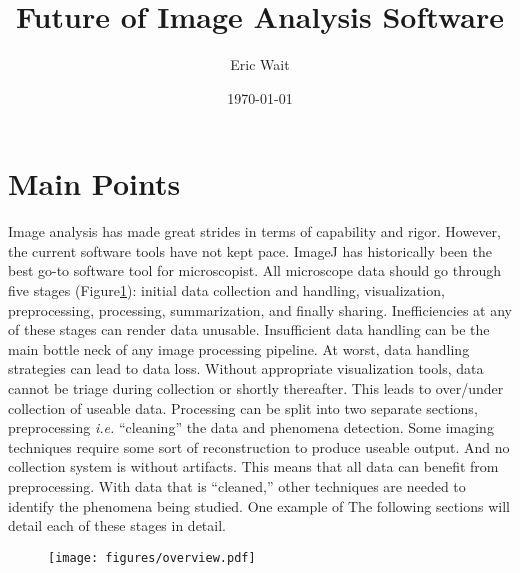 \documentclass[11pt]{article}
\author{Eric Wait}
\title{Future of Image Analysis Software}
\date{\today}
\newcommand{\ie}[1]{\textit{i.e.} {#1}}
\begin{document}
	\maketitle
	\newpage

	\tableofcontents

	\listoftodos
	\newpage

	\section{Main Points}\label{sec:main_points}
		Image analysis has made great strides in terms of capability and rigor.
		However, the current software tools have not kept pace.
		ImageJ has historically been the best go-to software tool for microscopist.
		All microscope data should go through five stages (Figure\ref{fig:overview}): initial data collection and handling, visualization, preprocessing, processing, summarization, and finally sharing.
		Inefficiencies at any of these stages can render data unusable.
		Insufficient data handling can be the main bottle neck of any image processing pipeline.
		At worst, data handling strategies can lead to data loss.
		Without appropriate visualization tools, data cannot be triage during collection or shortly thereafter.
		This leads to over/under collection of useable data.
		Processing can be split into two separate sections, preprocessing \ie{``cleaning'' the data} and phenomena detection.
		Some imaging techniques require some sort of reconstruction to produce useable output.
		And no collection system is without artifacts.
		This means that all data can benefit from preprocessing.
		With data that is ``cleaned,'' other techniques are needed to identify the phenomena being studied.
		One example of 
		The following sections will detail each of these stages in detail. 
		
		\begin{figure}
			\centering
				\texttt{[image: figures/overview.pdf]}
			\label{fig:overview}
		\end{figure}
\end{document}
